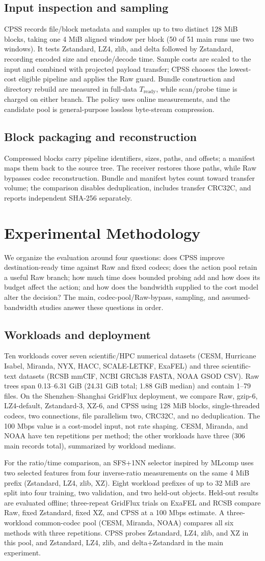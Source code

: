 \documentclass[smallabstract,smallcaptions]{dccpaper}
\renewcommand{\Section}[1]{\vspace*{-0.05in}\section{#1}\vspace{0.025in}}
\renewcommand{\SubSection}[1]{\vspace*{-0.125in}\subsection{#1}}
\begin{document}
\SubSection{Input inspection and sampling}
CPSS records file/block metadata and samples up to two distinct 128 MiB blocks, taking one 4 MiB aligned window per block (50 of 51 main runs use two windows). It tests Zstandard, LZ4, zlib, and delta followed by Zstandard, recording encoded size and encode/decode time. Sample costs are scaled to the input and combined with projected payload transfer; CPSS chooses the lowest-cost eligible pipeline and applies the Raw guard. Bundle construction and directory rebuild are measured in full-data $T_{\mathrm{ready}}$, while scan/probe time is charged on either branch. The policy uses online measurements, and the candidate pool is general-purpose lossless byte-stream compression.

\SubSection{Block packaging and reconstruction}
Compressed blocks carry pipeline identifiers, sizes, paths, and offsets; a manifest maps them back to the source tree. The receiver restores those paths, while Raw bypasses codec reconstruction. Bundle and manifest bytes count toward transfer volume; the comparison disables deduplication, includes transfer CRC32C, and reports independent SHA-256 separately.

\Section{Experimental Methodology}

We organize the evaluation around four questions: does CPSS improve destination-ready time against Raw and fixed codecs; does the action pool retain a useful Raw branch; how much time does bounded probing add and how does its budget affect the action; and how does the bandwidth supplied to the cost model alter the decision? The main, codec-pool/Raw-bypass, sampling, and assumed-bandwidth studies answer these questions in order.

\SubSection{Workloads and deployment}
Ten workloads cover seven scientific/HPC numerical datasets (CESM, Hurricane Isabel, Miranda, NYX, HACC, SCALE-LETKF, ExaFEL) and three scientific-text datasets (RCSB mmCIF, NCBI GRCh38 FASTA, NOAA GSOD CSV). Raw trees span 0.13--6.31 GiB (24.31 GiB total; 1.88 GiB median) and contain 1--79 files. On the Shenzhen--Shanghai GridFlux deployment, we compare Raw, gzip-6, LZ4-default, Zstandard-3, XZ-6, and CPSS using 128 MiB blocks, single-threaded codecs, two connections, file parallelism two, CRC32C, and no deduplication. The 100 Mbps value is a cost-model input, not rate shaping. CESM, Miranda, and NOAA have ten repetitions per method; the other workloads have three (306 main records total), summarized by workload medians.

For the ratio/time comparison, an SFS+1NN selector inspired by MLcomp uses two selected features from four inverse-ratio measurements on the same 4 MiB prefix (Zstandard, LZ4, zlib, XZ). Eight workload prefixes of up to 32 MiB are split into four training, two validation, and two held-out objects. Held-out results are evaluated offline; three-repeat GridFlux trials on ExaFEL and RCSB compare Raw, fixed Zstandard, fixed XZ, and CPSS at a 100 Mbps estimate. A three-workload common-codec pool (CESM, Miranda, NOAA) compares all six methods with three repetitions. CPSS probes Zstandard, LZ4, zlib, and XZ in this pool, and Zstandard, LZ4, zlib, and delta+Zstandard in the main experiment.
\end{document}

